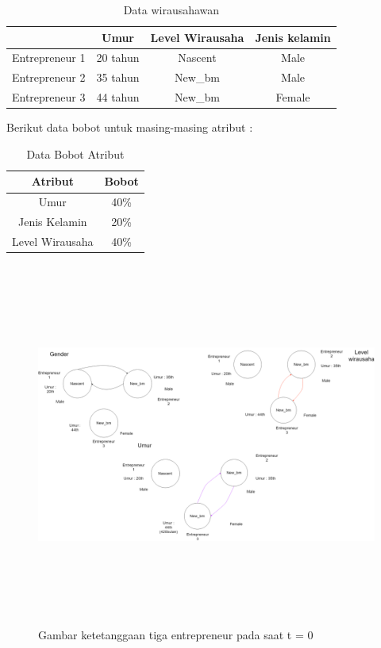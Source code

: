 \begin{table} [H]
\centering
\caption{Data wirausahawan}
\begin{tabular}{|c|c|c|c|}
\hline
& Umur & Level Wirausaha & Jenis kelamin\\
\hline
Entrepreneur 1 & 20 tahun & Nascent & Male\\
\hline
Entrepreneur 2 & 35 tahun & New\_bm & Male\\
\hline
Entrepreneur 3 & 44 tahun & New\_bm & Female\\
\hline
\end{tabular}
\end{table}

Berikut data bobot untuk masing-masing atribut :

\begin{table} [H]
\centering
\caption{Data Bobot Atribut}
\begin{tabular}{|c|c|}
\hline
Atribut & Bobot\\
\hline
Umur & 40\% \\
\hline
Jenis Kelamin & 20\% \\
\hline
Level Wirausaha & 40\% \\
\hline
\end{tabular}
\end{table}

	\begin{figure} [H]
		\centering  
		\includegraphics[width=18cm, height=12cm]{wirausaha(t=0)} 
		\caption[Gambar ketetanggaan tiga entrepreneur pada saat t = 0]{Gambar ketetanggaan tiga entrepreneur pada saat t = 0} 
		\label{fig:t0} 
	\end{figure}


